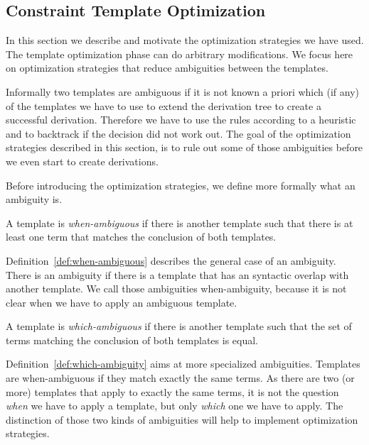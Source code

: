 \subsection{Constraint Template Optimization}
\label{sec:constr-templ-optim}
In this section we describe and motivate the optimization strategies
we have used. The template optimization phase can do arbitrary
modifications. We focus here on optimization strategies that reduce
ambiguities between the templates.

Informally two templates are ambiguous if it is not known a priori
which (if any) of the templates we have to use to extend the
derivation tree to create a successful derivation. Therefore we have
to use the rules according to a heuristic and to backtrack if the
decision did not work out. The goal of the optimization strategies
described in this section, is to rule out some of those ambiguities
before we even start to create derivations.

Before introducing the optimization strategies, we define more
formally what an ambiguity is.

\begin{definition}
  A template is \textit{when-ambiguous} if there is another template
  such that there is at least one term that matches the conclusion of
  both templates.
\label{def:when-ambiguous}
\end{definition}

Definition~\ref{def:when-ambiguous} describes the general case of an
ambiguity. There is an ambiguity if there is a template that has an
syntactic overlap with another template. We call those ambiguities
when-ambiguity, because it is not clear when we have to apply an
ambiguous template. 

\begin{definition}
  A template is \textit{which-ambiguous} if there is another template
  such that the set of terms matching the conclusion of both templates
  is equal.
\label{def:which-ambiguity}
\end{definition}

Definition~\ref{def:which-ambiguity} aims at more specialized
ambiguities. Templates are when-ambiguous if they match exactly the
same terms. As there are two (or more) templates that apply to exactly
the same terms, it is not the question \textit{when} we have to apply
a template, but only \textit{which} one we have to apply. The
distinction of those two kinds of ambiguities will help to implement
optimization strategies.

